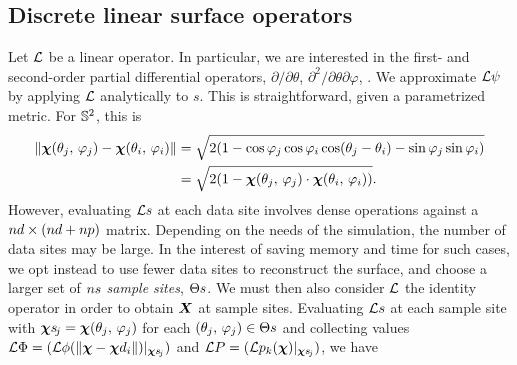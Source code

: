 \subsection{Discrete linear surface operators}

Let $\mathcal{L}$ be a linear operator. In particular, we are interested in the first- and
second-order partial differential operators, $\partial/\partial\theta$,
$\partial^2/\partial\theta\partial\varphi$, . We approximate $\mathcal{L}\psi$ by
applying $\mathcal{L}$ analytically to $s$. This is straightforward, given a parametrized metric.
For $\mathbb{S}^2$, this is
\begin{equation}\label{eq:sphere-metric}
    \begin{aligned}
    \|\boldsymbol{\chi}(\theta_j,\,\varphi_j) - \boldsymbol{\chi}(\theta_i,\,\varphi_i)\|
    &= \sqrt{2(1 - \cos\varphi_j\cos\varphi_i\cos(\theta_j-\theta_i) - \sin\varphi_j\sin\varphi_i)} \\
    &= \sqrt{2(1-\boldsymbol{\chi}(\theta_j,\,\varphi_j)\cdot\boldsymbol{\chi}(\theta_i,\,\varphi_i))}.
\end{aligned}
\end{equation}
However, evaluating $\mathcal{L} s$ at each data site involves dense operations against a
$\data\cardinality\times(\data\cardinality+\poly\cardinality)$ matrix. Depending on the
needs of the simulation, the number of data sites may be large.  In the interest of
saving memory and time for such cases, we opt instead to use fewer data sites to
reconstruct the surface, and choose a larger set of $\sample\cardinality$ \emph{sample
sites}, $\sample\sites$. We must then also consider $\mathcal{L}$ the identity operator in order
to obtain $\boldsymbol{X}$ at sample sites. Evaluating $\mathcal{L} s$ at each sample site with
$\Xpsj = \Xp(\theta_j,\,\varphi_j)$ for each $(\theta_j,\,\varphi_j)\in\sample\sites$ and
collecting values $\L\Phi = (\L\phi(\|\Xp-\data\Xp_i\|)|_{\Xpsj})$ and
$\L P = (\L p_k(\Xp)|_{\Xpsj})$, we have
